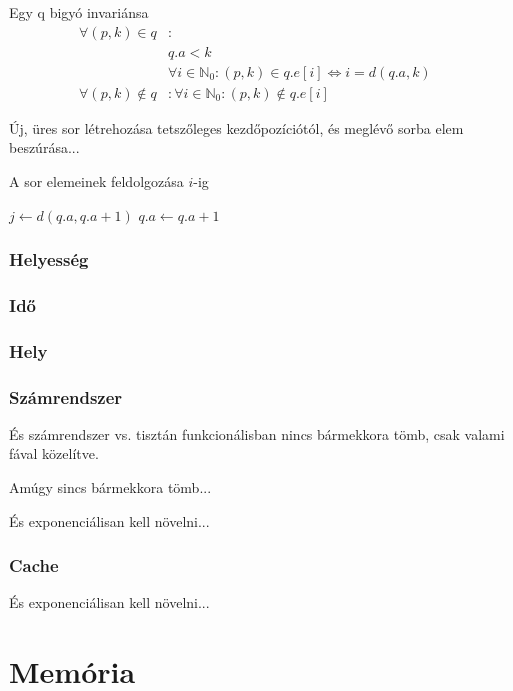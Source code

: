 \documentclass[12pt]{report}
\begin{document}
Egy q bigyó invariánsa
\begin{align*}
\forall (p, k) \in q &: &\\ 
	& q.a < k\\
	& \forall i \in \mathbb{N}_{0}: (p, k) \in q.e[i] \iff i=d(q.a, k) \\
\forall (p, k) \not\in q &: \forall i \in \mathbb{N}_{0}: (p, k) \not\in q.e[i]
\end{align*}

Új, üres sor létrehozása tetszőleges kezdőpozíciótól, és meglévő sorba elem beszúrása...

A sor elemeinek feldolgozása $i$-ig
\begin{algorithmic}[1]
	\State $j \gets d(q.a, q.a + 1)$
	\State $q.a \gets q.a + 1$
		\State {}
			\State {}
		\Else
			\State {}
		\EndIf
	\EndFor
\EndWhile
\end{algorithmic}

\subsubsection{Helyesség}

\subsubsection{Idő}

\subsubsection{Hely}

\subsubsection{Számrendszer}

És számrendszer vs. tisztán funkcionálisban nincs bármekkora tömb, csak valami fával közelítve.

Amúgy sincs bármekkora tömb...

És exponenciálisan kell növelni...

\subsubsection{Cache}

És exponenciálisan kell növelni...

\section{Memória}
\end{document}
